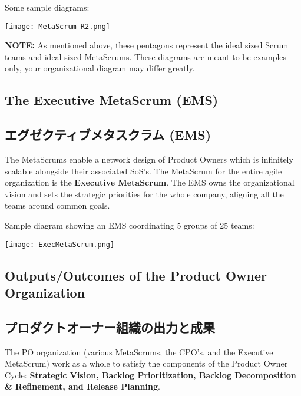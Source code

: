 \documentclass[12pt,a4paper,parskip=full]{scrartcl}
\begin{document}
Some sample diagrams:

\texttt{[image: MetaScrum-R2.png]}

\textbf{NOTE:} As mentioned above, these pentagons represent the ideal
sized Scrum teams and ideal sized MetaScrums. These diagrams are meant to
be examples only, your organizational diagram may differ greatly.

\subsection{The Executive MetaScrum (EMS)}
\fi
\subsection{エグゼクティブメタスクラム (EMS)}
The MetaScrums enable a network design of Product Owners which is
infinitely scalable alongside their associated SoS's. The MetaScrum for the
entire agile organization is the \textbf{Executive MetaScrum}. The EMS owns
the organizational vision and sets the strategic priorities for the whole
company, aligning all the teams around common goals.

Sample diagram showing an EMS coordinating 5 groups of 25 teams:

\texttt{[image: ExecMetaScrum.png]}

\subsection{Outputs/Outcomes of the Product Owner Organization}
\fi
\subsection{プロダクトオーナー組織の出力と成果}
The PO organization (various MetaScrums, the CPO's, and the Executive
MetaScrum) work as a whole to satisfy the components of the Product Owner
Cycle: \textbf{Strategic Vision, Backlog Prioritization, Backlog
Decomposition \& Refinement, and Release Planning}.
\end{document}
